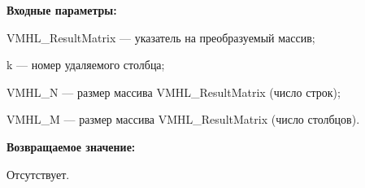 \textbf{Входные параметры:}  
 
VMHL\_ResultMatrix --- указатель на преобразуемый массив;
 
k --- номер удаляемого столбца;
 
VMHL\_N --- размер массива VMHL\_ResultMatrix (число строк);
 
VMHL\_M --- размер массива VMHL\_ResultMatrix (число столбцов).

\textbf{Возвращаемое значение:}

Отсутствует.